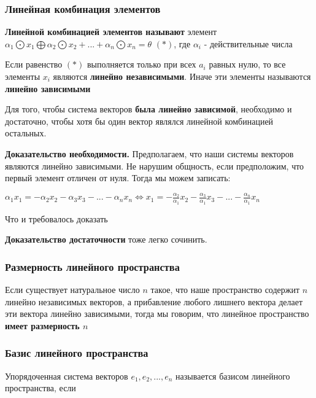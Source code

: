 \documentclass{article}
\begin{document}
\begin{flushleft}
\subsubsection{Линейная комбинация элементов}

\textbf{Линейной комбинацией элементов называют} элемент $\alpha_1 \bigodot x_1 \bigoplus \alpha_2 \bigodot x_2 + ... + \alpha_n \bigodot x_n = \theta$ $(*)$, где $\alpha_i$ - действительные числа 

\hfill

Если равенство $(*)$ выполняется только при всех $a_i$ равных нулю, то все элементы $x_i$ являются \textbf{линейно независимыми}. Иначе эти элементы называются \textbf{линейно зависимыми}

\hfill

Для того, чтобы система векторов \textbf{была линейно зависимой}, необходимо и достаточно, чтобы хотя бы один вектор являлся линейной комбинацией остальных.

\hfill

\textbf{Доказательство необходимости. } Предполагаем, что наши системы векторов являются линейно зависимыми. Не нарушим общность, если предположим, что первый элемент отличен от нуля. Тогда мы можем записать:

$\alpha_1 x_1 = -\alpha_2 x_2 - \alpha_3 x_3 - ... - \alpha_n x_n \Longleftrightarrow x_1 = -\frac{\alpha_2}{\alpha_1} x_2 - \frac{\alpha_3}{\alpha_1} x_3 - ... - \frac{\alpha_n}{\alpha_1} x_n$

Что и требовалось доказать

\hfill

\textbf{Доказательство достаточности} тоже легко сочинить.

\subsubsection{Размерность линейного пространства}

Если существует натуральное число $n$ такое, что наше пространство содержит $n$ линейно независимых векторов, а прибавление любого лишнего вектора делает эти вектора линейно зависимыми, тогда мы говорим, что линейное пространство \textbf{имеет размерность $n$}

\subsubsection{Базис линейного пространства}

Упорядоченная система векторов $e_1, e_2, ..., e_n$ называется базисом линейного пространства, если


\end{flushleft}
\end{document}
